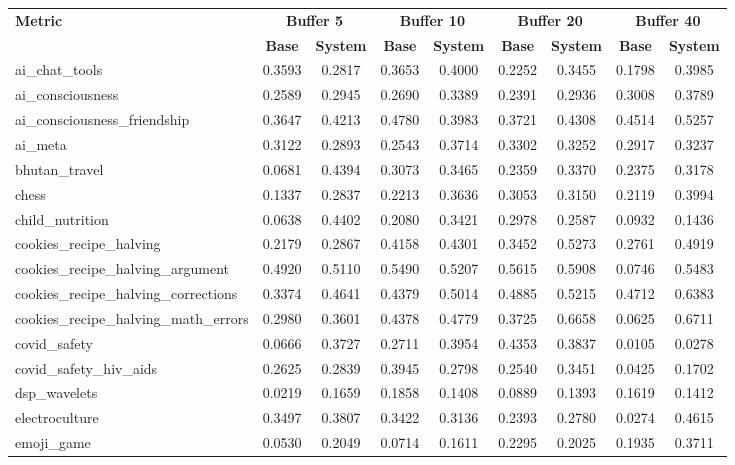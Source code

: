 \begin{landscape}
\begin{longtable}{@{}p{3.8cm}cccccccc@{}}
\toprule
\textbf{Metric} & \multicolumn{2}{c}{\textbf{Buffer 5}} & \multicolumn{2}{c}{\textbf{Buffer 10}} & \multicolumn{2}{c}{\textbf{Buffer 20}} & \multicolumn{2}{c}{\textbf{Buffer 40}} \\
\cmidrule(lr){2-3}\cmidrule(lr){4-5}\cmidrule(lr){6-7}\cmidrule(lr){8-9}
 & \textbf{Base} & \textbf{System} & \textbf{Base} & \textbf{System} & \textbf{Base} & \textbf{System} & \textbf{Base} & \textbf{System} \\
\midrule
\endhead
ai\_chat\_tools & 0.3593 & 0.2817 & 0.3653 & 0.4000 & 0.2252 & 0.3455 & 0.1798 & 0.3985 \\
ai\_consciousness & 0.2589 & 0.2945 & 0.2690 & 0.3389 & 0.2391 & 0.2936 & 0.3008 & 0.3789 \\
ai\_consciousness\_friendship & 0.3647 & 0.4213 & 0.4780 & 0.3983 & 0.3721 & 0.4308 & 0.4514 & 0.5257 \\
ai\_meta & 0.3122 & 0.2893 & 0.2543 & 0.3714 & 0.3302 & 0.3252 & 0.2917 & 0.3237 \\
bhutan\_travel & 0.0681 & 0.4394 & 0.3073 & 0.3465 & 0.2359 & 0.3370 & 0.2375 & 0.3178 \\
chess & 0.1337 & 0.2837 & 0.2213 & 0.3636 & 0.3053 & 0.3150 & 0.2119 & 0.3994 \\
child\_nutrition & 0.0638 & 0.4402 & 0.2080 & 0.3421 & 0.2978 & 0.2587 & 0.0932 & 0.1436 \\
cookies\_recipe\_halving & 0.2179 & 0.2867 & 0.4158 & 0.4301 & 0.3452 & 0.5273 & 0.2761 & 0.4919 \\
cookies\_recipe\_halving\_argument & 0.4920 & 0.5110 & 0.5490 & 0.5207 & 0.5615 & 0.5908 & 0.0746 & 0.5483 \\
cookies\_recipe\_halving\_corrections & 0.3374 & 0.4641 & 0.4379 & 0.5014 & 0.4885 & 0.5215 & 0.4712 & 0.6383 \\
cookies\_recipe\_halving\_math\_errors & 0.2980 & 0.3601 & 0.4378 & 0.4779 & 0.3725 & 0.6658 & 0.0625 & 0.6711 \\
covid\_safety & 0.0666 & 0.3727 & 0.2711 & 0.3954 & 0.4353 & 0.3837 & 0.0105 & 0.0278 \\
covid\_safety\_hiv\_aids & 0.2625 & 0.2839 & 0.3945 & 0.2798 & 0.2540 & 0.3451 & 0.0425 & 0.1702 \\
dsp\_wavelets & 0.0219 & 0.1659 & 0.1858 & 0.1408 & 0.0889 & 0.1393 & 0.1619 & 0.1412 \\
electroculture & 0.3497 & 0.3807 & 0.3422 & 0.3136 & 0.2393 & 0.2780 & 0.0274 & 0.4615 \\
emoji\_game & 0.0530 & 0.2049 & 0.0714 & 0.1611 & 0.2295 & 0.2025 & 0.1935 & 0.3711 \\

\end{longtable}
\end{landscape}
